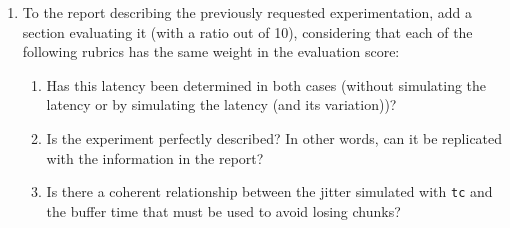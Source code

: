 \begin{enumerate}
\item To the report describing the previously requested
  experimentation, add a section evaluating it (with a ratio out of
  10), considering that each of the following rubrics has the same
  weight in the evaluation score:
\begin{enumerate}
\item Has this latency been determined in both cases (without
  simulating the latency or by simulating the latency (and its
  variation))?
\item Is the experiment perfectly described? In other words, can it be
  replicated with the information in the report?
\item Is there a coherent relationship between the jitter simulated
  with \texttt{tc} and the buffer time that must be used to avoid
  losing chunks?
\end{enumerate}

\end{enumerate}


